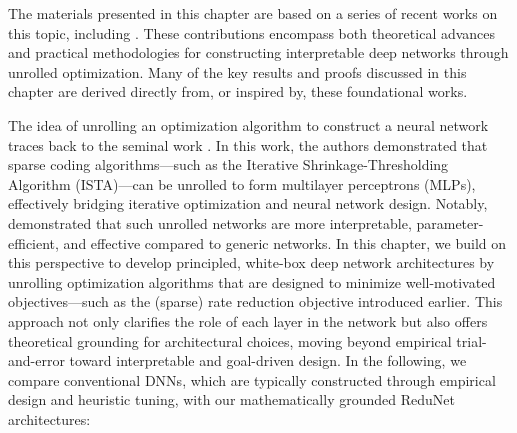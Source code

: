 \documentclass[../../book-main.tex]{subfiles}
\begin{document}



The materials presented in this chapter are based on a series of recent works on this topic, including \cite{chan2021redunet, wang2024global, wang2025attention, wu2025token, yu2023white}. These contributions encompass both theoretical advances and practical methodologies for constructing interpretable deep networks through unrolled optimization. Many of the key results and proofs discussed in this chapter are derived directly from, or inspired by, these foundational works. 


The idea of unrolling an optimization algorithm to construct a neural network traces back to the seminal work \cite{gregor2010learning}. In this work, the authors demonstrated that sparse coding algorithms—such as the Iterative Shrinkage-Thresholding Algorithm (ISTA)—can be unrolled to form multilayer perceptrons (MLPs), effectively bridging iterative optimization and neural network design. Notably, \cite{monga2019algorithm} demonstrated that such unrolled networks are more interpretable, parameter-efficient, and effective compared to generic networks. In this chapter, we build on this perspective to develop principled, white-box deep network architectures by unrolling optimization algorithms that are designed to minimize well-motivated objectives—such as the (sparse) rate reduction objective introduced earlier. This approach not only clarifies the role of each layer in the network but also offers theoretical grounding for architectural choices, moving beyond empirical trial-and-error toward interpretable and goal-driven design.  In the following, we compare conventional DNNs, which are typically constructed through empirical design and heuristic tuning, with our mathematically grounded ReduNet architectures: 
\end{document}

